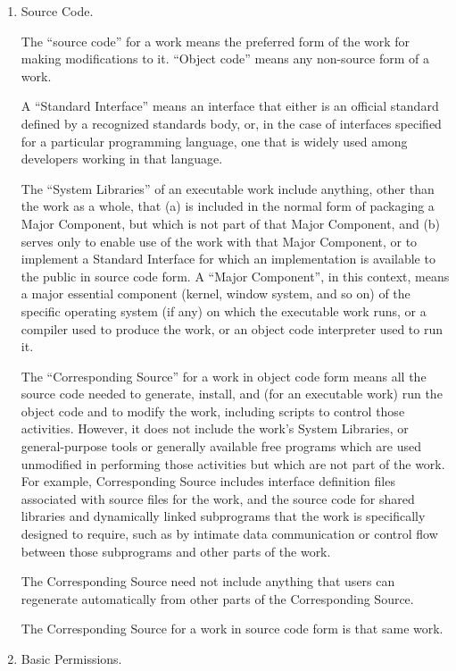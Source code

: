 \begin{enumerate}
	\item Source Code.
	
	The ``source code'' for a work means the preferred form of the work
	for making modifications to it.  ``Object code'' means any non-source
	form of a work.
	
	A ``Standard Interface'' means an interface that either is an official
	standard defined by a recognized standards body, or, in the case of
	interfaces specified for a particular programming language, one that
	is widely used among developers working in that language.
	
	The ``System Libraries'' of an executable work include anything, other
	than the work as a whole, that (a) is included in the normal form of
	packaging a Major Component, but which is not part of that Major
	Component, and (b) serves only to enable use of the work with that
	Major Component, or to implement a Standard Interface for which an
	implementation is available to the public in source code form.  A
	``Major Component'', in this context, means a major essential component
	(kernel, window system, and so on) of the specific operating system
	(if any) on which the executable work runs, or a compiler used to
	produce the work, or an object code interpreter used to run it.
	
	The ``Corresponding Source'' for a work in object code form means all
	the source code needed to generate, install, and (for an executable
	work) run the object code and to modify the work, including scripts to
	control those activities.  However, it does not include the work's
	System Libraries, or general-purpose tools or generally available free
	programs which are used unmodified in performing those activities but
	which are not part of the work.  For example, Corresponding Source
	includes interface definition files associated with source files for
	the work, and the source code for shared libraries and dynamically
	linked subprograms that the work is specifically designed to require,
	such as by intimate data communication or control flow between those
	subprograms and other parts of the work.
	
	The Corresponding Source need not include anything that users
	can regenerate automatically from other parts of the Corresponding
	Source.
	
	The Corresponding Source for a work in source code form is that
	same work.
	
	\item Basic Permissions.
	

\end{enumerate}
